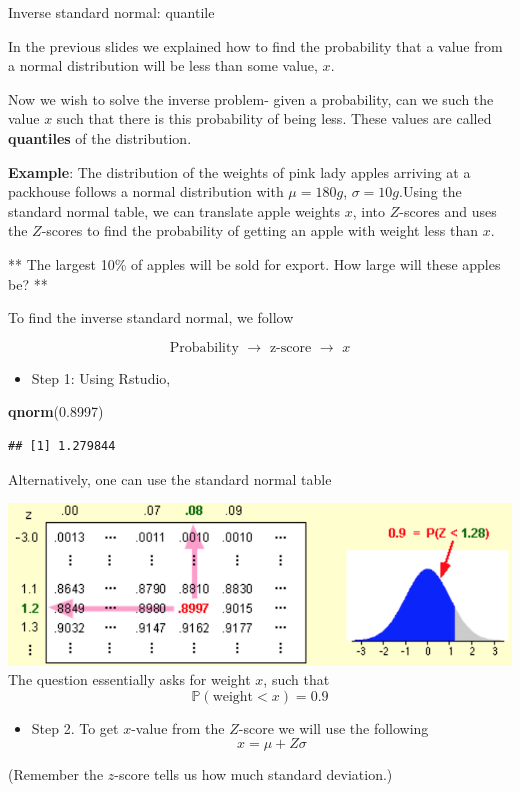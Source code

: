 \documentclass[ignorenonframetext,]{beamer}
\newenvironment{Shaded}{\begin{snugshade}}{\end{snugshade}}
\newcommand{\KeywordTok}[1]{\textcolor[rgb]{0.13,0.29,0.53}{\textbf{#1}}}
\newcommand{\FloatTok}[1]{\textcolor[rgb]{0.00,0.00,0.81}{#1}}
\newcommand{\NormalTok}[1]{#1}
\providecommand{\tightlist}{%
  \setlength{\itemsep}{0pt}\setlength{\parskip}{0pt}}
\begin{document}
\begin{frame}[fragile]{Inverse standard normal: quantile}

In the previous slides we explained how to find the probability that a
value from a normal distribution will be less than some value, \(x\).

Now we wish to solve the inverse problem- given a probability, can we
such the value \(x\) such that there is this probability of being less.
These values are called \textbf{quantiles} of the distribution.

\textbf{Example}: The distribution of the weights of pink lady apples
arriving at a packhouse follows a normal distribution with \(\mu=180g\),
\(\sigma=10g\).Using the standard normal table, we can translate apple
weights \(x\), into \(Z\)-scores and uses the \(Z\)-scores to find the
probability of getting an apple with weight less than \(x\).

** The largest 10\% of apples will be sold for export. How large will
these apples be? **

To find the inverse standard normal, we follow

\[\text{Probability}\,\,\longrightarrow \,\,\text{z-score}\,\,\longrightarrow \,\,x\]

\begin{itemize}
\tightlist
\item
  Step 1: Using Rstudio,
\end{itemize}

\begin{Shaded}
\begin{Highlighting}[]
\KeywordTok{qnorm}\NormalTok{(}\FloatTok{0.8997}\NormalTok{)}
\end{Highlighting}
\end{Shaded}

\begin{verbatim}
## [1] 1.279844
\end{verbatim}

Alternatively, one can use the standard normal table

\includegraphics{quantile.png} The question essentially asks for weight
\(x\), such that \[\mathbb{P}(\text{weight}<x)=0.9\]

\begin{itemize}
\tightlist
\item
  Step 2. To get \(x\)-value from the \(Z\)-score we will use the
  following \[x=\mu+Z\sigma\]
\end{itemize}

(Remember the \(z\)-score tells us how much standard deviation.)

\end{frame}
\end{document}
